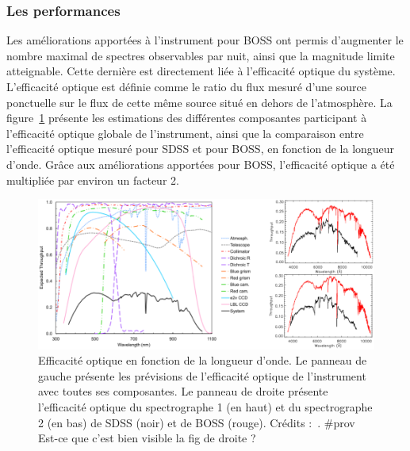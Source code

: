 \documentclass[11pt, twoside, a4paper, openright]{report}
\begin{document}
\subsubsection{Les performances}
Les améliorations apportées à l'instrument pour BOSS ont permis d'augmenter le nombre maximal de spectres observables par nuit, ainsi que la magnitude limite atteignable. Cette dernière est directement liée à l'efficacité optique du système. L'efficacité optique est définie comme le ratio du flux mesuré d'une source ponctuelle sur le flux de cette même source situé en dehors de l'atmosphère. La figure~\ref{fig:SpectroThroughput} présente les estimations des différentes composantes participant à l'efficacité optique globale de l'instrument, ainsi que la comparaison entre l'efficacité optique mesuré pour SDSS et pour BOSS, en fonction de la longueur d'onde. Grâce aux améliorations apportées pour BOSS, l'efficacité optique a été multipliée par environ un facteur 2.
\begin{figure}
  \centering
  \includegraphics[scale=0.4]{../img/eBOSS/SpectroThroughput}
  \caption{Efficacité optique en fonction de la longueur d'onde. Le panneau de gauche présente les prévisions de l'efficacité optique de l'instrument avec toutes ses composantes. Le panneau de droite présente l'efficacité optique du spectrographe 1 (en haut) et du spectrographe 2 (en bas) de SDSS (noir) et de BOSS (rouge). Crédits :~\cite{Smee2012}. \#prov Est-ce que c'est bien visible la fig de droite ?}
  \label{fig:SpectroThroughput}
\end{figure}
\end{document}
